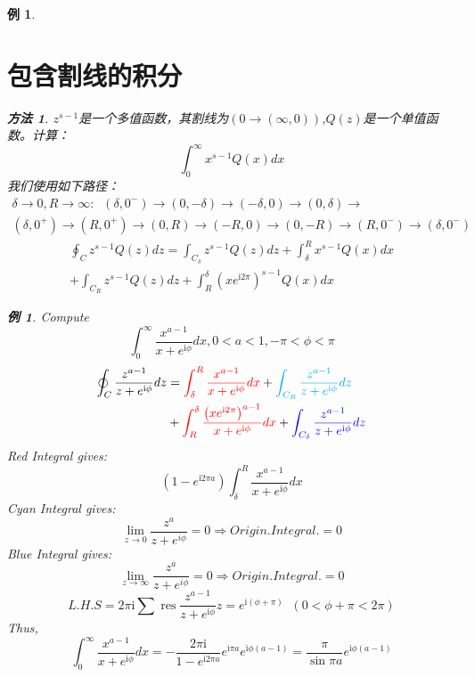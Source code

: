 \documentclass[10pt, a4paper, oneside]{ctexbook}
\newtheorem{example}[theorem]{例}
\newtheorem{method}[theorem]{方法}
\begin{document}
\begin{example}
\section{包含割线的积分}
\begin{method}
    $z^{s-1}$是一个多值函数，其割线为$(0\to (\infty,0))$,$Q(z)$是一个单值函数。计算：
    $$\int_{0}^{\infty} x^{s-1} Q(x) d x$$
    我们使用如下路径：
    \begin{align*}
        \delta\to0,R\to\infty:\;\;(\delta,0^-)\to(0,-\delta)\to(-\delta,0)\to(0,\delta)\to\\
        (\delta,0^+)\to(R,0^+)\to(0,R)\to(-R,0)\to(0,-R)\to(R,0^-)\to(\delta,0^-)
    \end{align*}
    $$
    \begin{aligned}
    \oint_{C} z^{s-1} Q(z) d z=\int_{C_{\delta}} z^{s-1} Q(z) d z+\int_{\delta}^{R} x^{s-1} Q(x) d x \\
    +\int_{C_{R}} z^{s-1} Q(z) d z+\int_{R}^{\delta}\left(x e^{\mathrm{i} 2 \pi}\right)^{s-1} Q(x) d x
    \end{aligned}
    $$
\end{method}
\begin{example}
    Compute $$\int_{0}^{\infty} \frac{x^{a-1}}{x+e^{\mathrm{i} \phi}} d x, 0<a<1,-\pi<\phi<\pi$$\rm
    \begin{align*}
        \oint_{C} \frac{z^{a-1}}{z+e^{\mathrm{i} \phi}} d z&={\color{red}\int_{\delta}^{R} \frac{x^{a-1}}{x+e^{\mathrm{i} \phi}} d x}+{\color{cyan}\int_{C_{R}} \frac{z^{a-1}}{z+e^{\mathrm{i} \phi}} d z}\\
        &+{\color{red} \int_{R}^{\delta} \frac{\left(x e^{\mathrm{i} 2 \pi}\right)^{a-1}}{x+e^{\mathrm{i} \phi}} d x}+{\color{blue}\int_{C_{\delta}} \frac{z^{a-1}}{z+e^{\mathrm{i} \phi}} d z}
    \end{align*}
    {\color{red} Red Integral} gives:
    $$
    \left(1-e^{\mathrm{i} 2 \pi a}\right) \int_{\delta}^{R} \frac{x^{a-1}}{x+e^{\mathrm{i} \phi}} d x
    $$
    {\color{cyan} Cyan Integral} gives:
    $$
    \lim_{z\to 0}\frac{z^a}{z+e^{i\phi}}=0\Rightarrow
    Origin.Integral.=0
    $$
    {\color{blue} Blue Integral} gives:
    $$
    \lim_{z\to \infty}\frac{z^a}{z+e^{i\phi}}=0\Rightarrow
    Origin.Integral.=0
    $$
    $$
    L.H.S=2 \pi \mathrm{i} \sum \operatorname{res} \frac{z^{a-1}}{z+e^{\mathrm{i} \phi}} z=e^{\mathrm{i}(\phi+\pi)}\;\;( 0<\phi+\pi<2 \pi)
    $$
    Thus,
    $$
    \int_{0}^{\infty} \frac{x^{a-1}}{x+e^{\mathrm{i} \phi}} d x=-\frac{2 \pi \mathrm{i}}{1-e^{\mathrm{i} 2 \pi a}} e^{\mathrm{i} \pi a} e^{\mathrm{i} \phi(a-1)}=\frac{\pi}{\sin \pi a} e^{\mathrm{i} \phi(a-1)}
    $$
\end{example}
\end{example}
\end{document}

